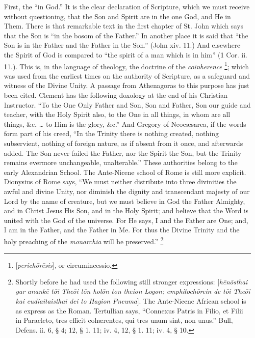First, the ``in God.'' It is the clear declaration of
Scripture, which we must receive without questioning, that the Son and
Spirit are in the one God, and He in Them. There is that remarkable
text in the first chapter of St. John which says that the Son is
``in the bosom of the Father.'' In another place it is
said that ``the Son is in the Father and the Father in the
Son.'' (John xiv. 11.) And elsewhere the Spirit of God is compared
to ``the spirit of a man which is in him'' (1 Cor. ii. 11.).
This is, in the language of theology, the doctrine of the \emph{coinherence}
\footnote{[\emph{perich\={o}r\={e}sis}], or
circumincessio.}; which was used from
the earliest times on the authority of Scripture, as a safeguard and
witness of the Divine Unity. A passage from Athenagoras to this
purpose has just been cited. Clement has the following doxology at the
end of his Christian Instructor. ``To the One Only Father and Son,
Son and Father, Son our guide and teacher, with the Holy Spirit also,
to the One in all things, in whom are all things, \&c. … to Him
is the glory, \&c.'' And Gregory of Neocæsarea, if the words
form part of his creed, ``In the Trinity there is nothing created,
nothing subservient, nothing of foreign nature, as if absent from it
once, and afterwards added. The Son never failed the Father, nor the
Spirit the Son, but the Trinity remains evermore unchangeable,
unalterable.'' These authorities belong to the early Alexandrian
School. The Ante-Nicene school of Rome is still more explicit.
Dionysius of Rome says, ``We must neither distribute into three
divinities the awful and divine Unity, nor diminish the dignity and
transcendant majesty of our Lord by the name of creature, but we must
believe in God the Father Almighty, and in Christ Jesus His Son, and
in the Holy Spirit; and believe that the Word is united with the God
of the universe. For He says, I and the Father are One; and, I am in
the Father, and the Father in Me. For thus the Divine Trinity
and the holy preaching of the \emph{monarchia} will be
preserved.'' \footnote{Shortly before he had used the following
still stronger expressions: [\emph{h\={e}n\={o}sthai gar anank\={e}
t\={o}i The\={o}i t\={o}n hol\={o}n ton theion Logon;
emphiloch\={o}rein de t\={o}i The\={o}i kai eudiaitaisthai dei
to Hagion Pneuma}]. The Ante-Nicene African school is as express as
the Roman. Tertullian says, ``Connexus Patris in Filio, et Filii
in Paracleto, tres efficit cohærentes, qui tres unum sint, non unus.''
Bull, Defens. ii. 6, § 4; 12, § 1. 11; iv. 4, 12, § 1. 11; iv. 4,
§ 10.}

